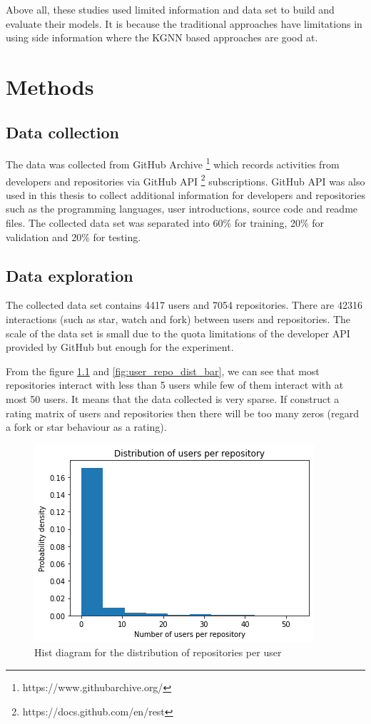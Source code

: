 \documentclass[11pt,twoside]{report}
\begin{document}
Above all, these studies used limited information and data set to build and evaluate their models. It is because the traditional approaches have limitations in using side information where the KGNN based approaches are good at.

\chapter{Methods}
\section{Data collection}
The data was collected from GitHub Archive \footnote{https://www.githubarchive.org/} which records activities from developers and repositories via GitHub API \footnote{https://docs.github.com/en/rest} subscriptions. GitHub API was also used in this thesis to collect additional information for developers and repositories such as the programming languages, user introductions, source code and readme files. The collected data set was separated into 60\% for training, 20\% for validation and 20\% for testing.

\section{Data exploration}
The collected data set contains 4417 users and 7054 repositories. There are 42316 interactions (such as star, watch and fork) between users and repositories. The scale of the data set is small due to the quota limitations of the developer API provided by GitHub but enough for the experiment.

From the figure \ref{fig:user_repo_dist_hist} and \ref{fig:user_repo_dist_bar}, we can see that most repositories interact with less than 5 users while few of them interact with at most 50 users. It means that the data collected is very sparse. If construct a rating matrix of users and repositories then there will be too many zeros (regard a fork or star behaviour as a rating).

\begin{figure}[H]
    \centering
    \includegraphics[scale=0.9]{user_repo_dist_hist.png}
    \caption{Hist diagram for the distribution of repositories per user}
    \label{fig:user_repo_dist_hist}
\end{figure}
\end{document}
